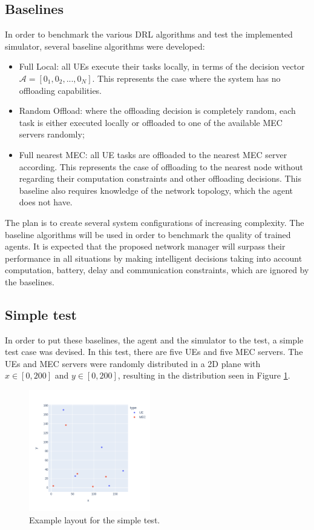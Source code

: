 \documentclass[conference]{IEEEtran}
\begin{document}
\subsection{Baselines} \label{baselines}
\noindent In order to benchmark the various \acrshort{DRL} algorithms and test the implemented simulator, several baseline algorithms were developed:

\begin{itemize}
    \item Full Local: all \acrshort{UE}s execute their tasks locally, in terms of the decision vector $\mathcal{A}=[0_1, 0_2, ..., 0_N]$. This represents the case where the system has no offloading capabilities.
    \item Random Offload: where the offloading decision is completely random, each task is either executed locally or offloaded to one of the available \acrshort{MEC} servers randomly;
    \item Full nearest \acrshort{MEC}: all \acrshort{UE} tasks are offloaded to the nearest \acrshort{MEC} server according. This represents the case of offloading to the nearest node without regarding their computation constraints and other offloading decisions. This baseline also requires knowledge of the network topology, which the agent does not have.
\end{itemize}

The plan is to create several system configurations of increasing complexity. The baseline algorithms will be used in order to benchmark the quality of trained agents. It is expected that the proposed network manager will surpass their performance in all situations by making intelligent decisions taking into account computation, battery, delay and communication constraints, which are ignored by the baselines.

\subsection{Simple test} \label{simple_test}

In order to put these baselines, the agent and the simulator to the test, a simple test case was devised. In this test, there are five \acrshort{UE}s and five \acrshort{MEC} servers. The UEs and MEC servers were randomly distributed in a 2D plane with $x \in [0, 200]$ and $y \in [0, 200]$, resulting in the distribution seen in Figure \ref{example_layout}.

\begin{figure}[H]
  \centering
  \includegraphics[width=200px]{images/example_layout.png}
  \caption{Example layout for the simple test.}  \label{example_layout}
\end{figure}
\end{document}
